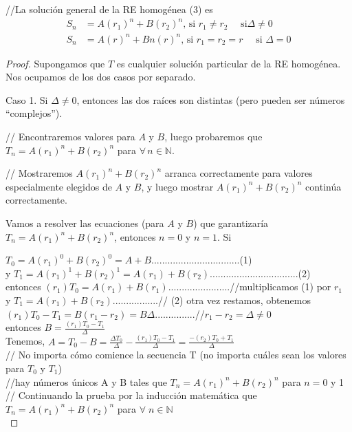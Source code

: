 \begin{theorem}
//La solución general de la RE homogénea (3) es
\begin{align*}
S_{n}
&=A(r_1)^{n}+B(r_2)^{n}\text{, si }r_{1}\neq r_{2}\quad\text{ si}\Delta\neq0\\
S_{n}
&=A(r)^n+Bn(r)^{n}\text{, si }r_{1}=r_{2}=r\quad\text{ si }\Delta=0
\end{align*}
\end{theorem}
\begin{proof}
Supongamos que $T$ es cualquier solución particular de la RE homogénea. Nos ocupamos de los dos casos por separado.

Caso 1. Si $\Delta\neq 0$, entonces las dos raíces son distintas (pero pueden ser números ``complejos'').

// Encontraremos valores para $A$ y $B$, luego probaremos que $T_{n}=A(r_1)^{n}+B(r_2)^{n}$ para $\forall\,n\in\mathds{N}$.

// Mostraremos $A(r_1)^{n}+B(r_2)^{n}$ arranca correctamente para valores especialmente elegidos de $A$ y $B$, y luego mostrar $A(r_1)^{n} + B(r_2)^{n}$ continúa correctamente.

Vamos a resolver las ecuaciones (para $A$ y $B$) que garantizaría $T_n=A(r_1)^n + B(r_2)^n$, entonces $n=0$ y $n=1$. Si


$T_0 = A(r_1)^0 + B(r_2)^0 = A + B$.................................(1)\\
y $T_1 = A(r_1)^1 + B(r_2)^1 = A(r_1) + B(r_2)$.................................(2)\\

entonces $(r_1)T_0 = A(r_1) + B(r_1)$.......................//multiplicamos (1) por $r_1$\\
y $T_1 = A(r_1) + B(r_2)$.................// (2) otra vez restamos, obtenemos\\

$(r_1)T_0 - T_1 = B(r_1 - r_2) = B\Delta$...............//$r_1 - r_2 = \Delta \neq 0$\\

entonces $B = \frac{(r_1)T_0 - T_1}{\Delta}$\\

Tenemos, $A=T_0 - B =\frac{\Delta T_0}{\Delta} -\frac{(r_1)T_0 - T_1}{\Delta} = \frac{-(r_2)T_0+T_1}{\Delta}$\\
// No importa cómo comience la secuencia T (no importa cuáles sean los valores para $T_0$ y $T_1$)\\
//hay números únicos A y B tales que $T_n = A(r_1)^n + B(r_2)^n$ para $n = 0$ y 1\\
// Continuando la prueba por la inducción matemática que $T_n= A(r_1)^n + B(r_2)^n$ para $\forall \; n \in \mathbb{N}$\\


\end{proof}
